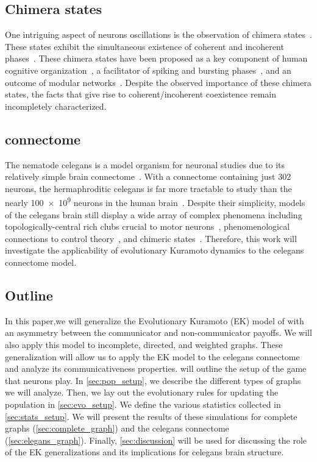 \documentclass[pdflatex,lineno,referee,sn-mathphys-ay]{sn-jnl}
\begin{document}
\subsection{Chimera states}
One intriguing aspect of neurons oscillations
is the observation of chimera states~\citep
[\eg{}][and references therein]{majhi2019chimera}.
These states exhibit the simultaneous existence
of coherent and incoherent phases~\citep{abrams2004chimera}.
These chimera states have been proposed
as a key component of human cognitive organization~\citep{bansal2019cognitive},
a facilitator of spiking and bursting phases~\citep{santos2017chimera},
and an outcome of modular networks~\citep{hizanidis2016chimera}.
Despite the observed importance of these chimera states,
the facts that give rise to coherent/incoherent coexistence
remain incompletely characterized.

\subsection{ connectome}
The nematode \gls{celegans}
is a model organism for neuronal studies due to
its relatively simple brain connectome~\citep{cook2019whole}.
With a connectome containing just \num{302} neurons,
the hermaphroditic \gls{celegans} is far more tractable to study
than the nearly \num{100e9} neurons
in the human brain~\citep[\eg][]{von2016search}.
Despite their simplicity, models of the \gls{celegans} brain
still display a wide array of complex phenomena including
topologically-central rich clubs
crucial to motor neurons~\citep{towlson2013rich},
phenomenological connections to control theory~\citep{yan2017network},
and chimeric states~\citep{hizanidis2016chimera}.
Therefore, this work will investigate the applicability
of evolutionary Kuramoto dynamics to the \gls{celegans}
connectome model.

\subsection{Outline}
In this paper,we will generalize
the Evolutionary Kuramoto (EK) model
of \citet{tripp2022evolutionary} with an asymmetry between
the communicator and non-communicator payoffs.
We will also apply this model to incomplete, directed, and weighted graphs.
These generalization will allow us to apply the EK model
to the \gls{celegans} connectome
and analyze its communicativeness properties.
 will outline the setup of the game that neurons play.
In \cref{sec:pop_setup}, we describe the different types
of graphs we will analyze.
Then, we lay out the evolutionary rules for updating the population
in \cref{sec:evo_setup}.
We define the various statistics collected in \cref{sec:stats_setup}.
We will present the results of these simulations for
complete graphs (\cref{sec:complete_graph})
and the \gls{celegans} connectome (\cref{sec:elegans_graph}).
Finally, \cref{sec:discussion} will be used
for discussing the role of the EK generalizations
and its implications for \gls{celegans} brain structure.
\end{document}
